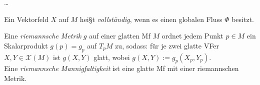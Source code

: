 \dots

\begin{defi}[Vollständiges VF]
    Ein Vektorfeld $X$ auf $M$ hei§t \emph{vollständig}, 
    wenn es einen globalen Fluss $\Phi$ besitzt.
\end{defi}

\begin{defi}[Riemannsche Mf]
    Eine \emph{riemannsche Metrik} $g$ auf einer glatten Mf $M$ ordnet 
    jedem Punkt $p \in M$ ein Skalarprodukt $g(p) = g_p$ auf $T_pM$ zu, sodass:
    für je zwei glatte VFer $X, Y \in \mathcal{X}(M)$ ist $g(X, Y)$ glatt, 
    wobei $g(X, Y) := g_p(X_p, Y_p)$. \\
    Eine \emph{riemannsche Mannigfaltigkeit} ist eine glatte Mf mit einer riemannschen Metrik.
\end{defi}
